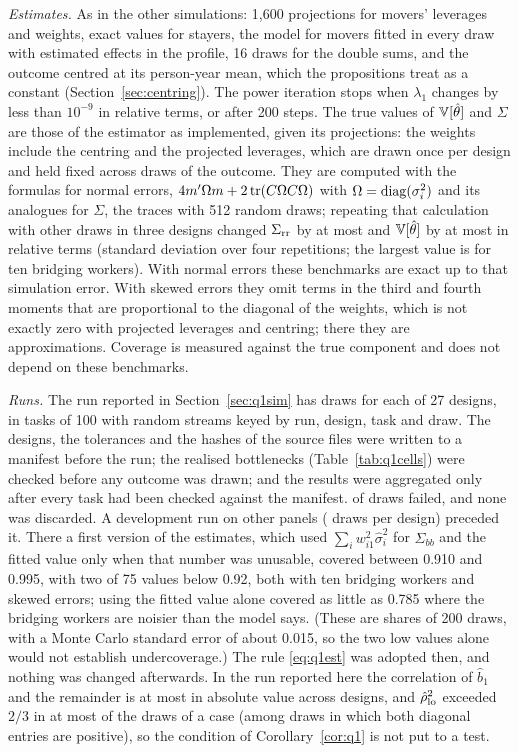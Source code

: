 \emph{Estimates.} As in the other simulations: 1,600 projections for movers' leverages and weights, exact values
for stayers, the model for movers fitted in every draw with estimated effects in the profile, 16 draws for the
double sums, and the outcome centred at its person-year mean, which the propositions treat as a constant
(Section~\ref{sec:centring}). The power iteration stops when $\lambda_1$ changes by less than $10^{-9}$ in
relative terms, or after 200 steps. The true values of $\mathbb{V}[\hat\theta]$ and $\Sigma$ are those of the estimator
as implemented, given its projections: the weights include the centring and the projected leverages, which are
drawn once per design and held fixed across draws of the outcome. They are computed with the formulas for
normal errors, $4m'\Omega m+2\operatorname{tr}(C\Omega C\Omega)$ with $\Omega=\operatorname{diag}(\sigma_i^2)$ and its analogues for $\Sigma$,
the traces with 512 random draws; repeating that calculation with other draws in three designs changed
$\Sigma_{\rm rr}$ by at most  and $\mathbb{V}[\hat\theta]$ by at most  in relative terms (standard
deviation over four repetitions; the largest value is for ten bridging workers). With normal errors these
benchmarks are exact up to that simulation error. With skewed errors they omit terms in the third and fourth
moments that are proportional to the diagonal of the weights, which is not exactly zero with projected
leverages and centring; there they are approximations. Coverage is measured against the true component and
does not depend on these benchmarks.

\emph{Runs.} The run reported in Section~\ref{sec:q1sim} has  draws for each of 27 designs, in tasks of
100 with random streams keyed by run, design, task and draw. The designs, the tolerances and the hashes of the
source files were written to a manifest before the run; the realised bottlenecks (Table~\ref{tab:q1cells}) were
checked before any outcome was drawn; and the results were aggregated only after every task had been checked
against the manifest.  of  draws failed, and none was discarded. A
development run on other panels ( draws per design) preceded it. There a first version of the
estimates, which used $\sum_iw_{i1}^2\hat\sigma_i^2$ for $\hat\Sigma_{bb}$ and the fitted value only when that number
was unusable, covered between 0.910 and 0.995, with two of 75 values below 0.92, both with ten bridging workers
and skewed errors; using the fitted value alone covered as little as 0.785 where the bridging workers are
noisier than the model says. (These are shares of 200 draws, with a Monte Carlo standard error of about 0.015,
so the two low values alone would not establish undercoverage.) The rule \eqref{eq:q1est} was adopted then, and
nothing was changed afterwards. In the run reported here the correlation of $\hat b_1$ and the remainder is at
most  in absolute value across designs, and $\hat\rho_{\rm lo}^2$ exceeded $2/3$ in at most
 of the draws of a case (among draws in which both diagonal entries are positive), so the
condition of Corollary~\ref{cor:q1} is not put to a test.

